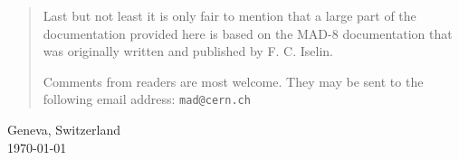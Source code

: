 \begin{titlepage}
\begin{quotation}
Last but not least it is only fair to mention that a large part of the
documentation provided here is based on the MAD-8 documentation that was
originally written and published by F. C. Iselin.  

Comments from readers are most welcome. They may be sent to the
following email address: \texttt{mad@cern.ch}
\end{quotation}
\vfill

\begin{center}
Geneva, Switzerland \\
\today
\end{center}

\end{titlepage}



